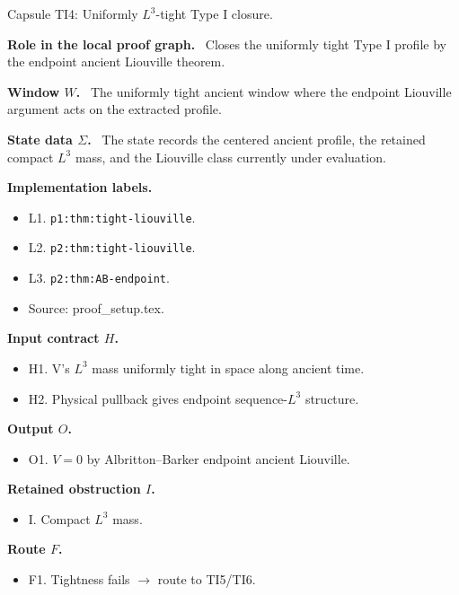 \documentclass[11pt]{amsart}
\newcommand{\capsulefield}[1]{\par\smallskip\noindent\textbf{#1.}\ }
\begin{document}
\begin{proofcapsule}{Capsule TI4: Uniformly $L^3$-tight Type I closure.}
  \capsulefield{Role in the local proof graph}
  Closes the uniformly tight Type I profile by the endpoint ancient Liouville theorem.

  \capsulefield{Window \(W\)}
The uniformly tight ancient window where the endpoint Liouville argument acts on the extracted profile.

  \capsulefield{State data \(\Sigma\)}
The state records the centered ancient profile, the retained compact $L^3$ mass, and the Liouville class currently under evaluation.

  \capsulefield{Implementation labels}
  \begin{itemize}[leftmargin=1.8em]
  \item L1. \texttt{p1:thm:tight-liouville}.
  \item L2. \texttt{p2:thm:tight-liouville}.
  \item L3. \texttt{p2:thm:AB-endpoint}.
  \item Source: proof\_setup.tex.
  \end{itemize}

  \capsulefield{Input contract \(H\)}
  \begin{itemize}[leftmargin=1.8em]
  \item H1. V's $L^3$ mass uniformly tight in space along ancient time.
  \item H2. Physical pullback gives endpoint sequence-$L^3$ structure.
  \end{itemize}

  \capsulefield{Output \(O\)}
  \begin{itemize}[leftmargin=1.8em]
  \item O1. \(V=0\) by Albritton--Barker endpoint ancient Liouville.
  \end{itemize}

  \capsulefield{Retained obstruction \(I\)}
  \begin{itemize}[leftmargin=1.8em]
  \item I. Compact $L^3$ mass.
  \end{itemize}

  \capsulefield{Route \(F\)}
  \begin{itemize}[leftmargin=1.8em]
  \item F1. Tightness fails $\to$ route to TI5/TI6.
  \end{itemize}


\end{proofcapsule}
\end{document}
